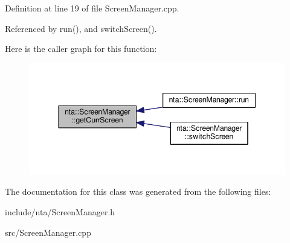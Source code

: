 Definition at line 19 of file Screen\+Manager.\+cpp.



Referenced by run(), and switch\+Screen().

Here is the caller graph for this function\+:\nopagebreak
\begin{figure}[H]
\begin{center}
\leavevmode
\includegraphics[width=344pt]{d0/dc4/classnta_1_1ScreenManager_a4b26e8adc481bfb37a088e047e4ccc2a_icgraph}
\end{center}
\end{figure}


The documentation for this class was generated from the following files\+:\begin{DoxyCompactItemize}
\item 
include/nta/Screen\+Manager.\+h\item 
src/Screen\+Manager.\+cpp\end{DoxyCompactItemize}
